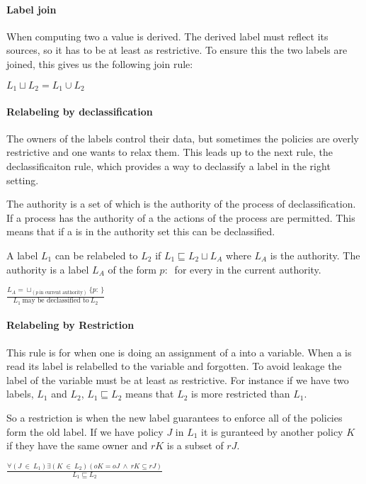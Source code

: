 \paragraph{Label join}
When computing two \xvalues{} a value is derived.
The derived \xvalues{} label must reflect its sources, so it has to be at least as restrictive.
To ensure this the two labels are joined, this gives us the following join rule:
\begin{center}
  $L_1 \sqcup L_2 = L_1 \cup L_2$
\end{center}

\paragraph{Relabeling by declassification}
The owners of the labels control their data, but sometimes the policies are overly restrictive and one wants to relax them.
This leads up to the next rule, the declassificaiton rule, which provides a way to declassify a label in the right setting.

The authority is a set of \principals{} which is the authority of the process of declassification.
If a process has the authority of a \principal{} the actions of the process are permitted.
This means that if a \principal{} is in the authority set this can be declassified.

A label $L_1$ can be relabeled to $L_2$ if $L_1 \sqsubseteq L_2 \sqcup L_A$ where $L_A$ is the authority.
The authority is a label $L_A$ of the form ${p: \ }$ for every \principal{} in the current authority.

\begin{center}
  $\frac{L_A = \sqcup_{(p \  \mbox{in current authority})}\{p: \ \}}{L_1 \ \mbox{may be declassified to} \ L_2}$
\end{center}

\paragraph{Relabeling by Restriction}
This rule is for when one is doing an assignment of a \xvalue{} into a variable.
When a \xvalue{} is read its label is relabelled to the variable and forgotten.
To avoid leakage the label of the variable must be at least as restrictive.
For instance if we have two labels, $L_1$ and $L_2$, $L_1 \sqsubseteq L_2$ means that $L_2$ is more restricted than $L_1$.

So a restriction is when the new label guarantees to enforce all of the policies form the old label.
If we have policy $J$ in $L_1$ it is guranteed by another policy $K$ if they have the same owner and $rK$ is a subset of $rJ$.
\begin{center}
$\frac{\forall (J \ \in \ L_1) \exists (K \ \in \ L_2)(oK = oJ \ \wedge \ rK \subseteq rJ)}{L_1 \sqsubseteq L_2}$
\end{center}

